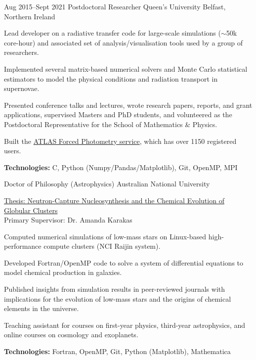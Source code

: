 \documentclass[11pt]{article} %
\begin{document}
\job
{Aug 2015--}{Sept 2021}
{Postdoctoral Researcher}
{}
{Queen's University Belfast, Northern Ireland}
{\begin{itemize-noindent}
\item{Lead developer on a radiative transfer code for large-scale simulations ($\sim$50k core-hour) and associated set of analysis/visualisation tools used by a group of researchers.}
\item{Implemented several matrix-based numerical solvers and Monte Carlo statistical estimators to model the physical conditions and radiation transport in supernovae.}
\item{Presented conference talks and lectures, wrote research papers, reports, and grant applications, supervised Masters and PhD students, and volunteered as the Postdoctoral Representative for the School of Mathematics \& Physics.}
\item{Built the \href{https://fallingstar-data.com/forcedphot/}{ATLAS Forced Photometry service}, which has over 1150 registered users.}
\end{itemize-noindent}
\textbf{Technologies:} C, Python (Numpy/Pandas/Matplotlib), Git, OpenMP, MPI\\
}

{Doctor of Philosophy (Astrophysics)}
{}{Australian National University}
{
\href{https://openresearch-repository.anu.edu.au/handle/1885/16507}{Thesis: Neutron-Capture Nucleosynthesis and the Chemical Evolution of Globular Clusters}\\
Primary Supervisor: Dr. Amanda Karakas
\begin{itemize-noindent}
  \item Computed numerical simulations of low-mass stars on Linux-based high-performance compute clusters (NCI Raijin system).
  \item Developed Fortran/OpenMP code to solve a system of differential equations to model chemical production in galaxies.
  \item Published insights from simulation results in peer-reviewed journals with implications for the evolution of low-mass stars and the origins of chemical elements in the universe.
  \item Teaching assistant for courses on first-year physics, third-year astrophysics, and online courses on cosmology and exoplanets.
\end{itemize-noindent}
\textbf{Technologies:} Fortran, OpenMP, Git, Python (Matplotlib), Mathematica
}
\end{document}

